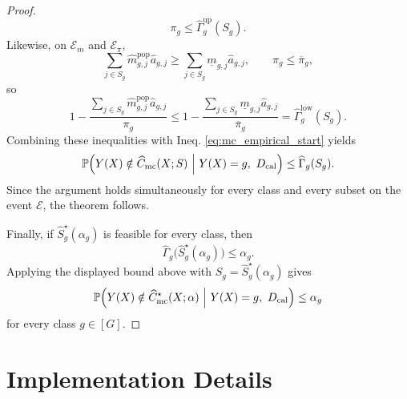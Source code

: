\documentclass[11pt]{article}
\theoremstyle{statplain}
\theoremstyle{statdefinition}
\newcommand{\mc}{\mathrm{mc}}
\newcommand{\PP}{\mathbb{P}}
\newcommand{\0}{\mathbf{0}}
\newcommand{\numClass}{G} %
\newcommand{\iteratorClass}{g}
\begin{document}
\begin{proof}
\[{}{
\pi_\iteratorClass
}
\le
\widehat\Gamma_{\iteratorClass}^{\mathrm{up}}(S_\iteratorClass).
\]
Likewise, on $\mathcal{E}_m$ and $\mathcal{E}_\pi$,
\[
\sum_{j\in S_\iteratorClass}
\widehat m_{\iteratorClass,j}^{\mathrm{pop}}
\widehat a_{\iteratorClass,j}
\ge
\sum_{j\in S_\iteratorClass}
\underline m_{\iteratorClass,j}
\widehat a_{\iteratorClass,j},
\qquad
\pi_\iteratorClass\le \overline\pi_\iteratorClass,
\]
so
\[
1-
\frac{
\sum_{j\in S_\iteratorClass}
\widehat m_{\iteratorClass,j}^{\mathrm{pop}}
\widehat a_{\iteratorClass,j}
}{
\pi_\iteratorClass
}
\le
1-
\frac{
\sum_{j\in S_\iteratorClass}
\underline m_{\iteratorClass,j}
\widehat a_{\iteratorClass,j}
}{
\overline\pi_\iteratorClass
}
=
\widehat\Gamma_{\iteratorClass}^{\mathrm{low}}(S_\iteratorClass).
\]
Combining these inequalities with Ineq. \eqref{eq:mc_empirical_start} yields
\[
\PP\Bigl(
Y(X)\notin \widehat C_{\mc}(X;S)
\ \Big|\
Y(X)=\iteratorClass,\ D_{\mathrm{cal}}
\Bigr)
\le
\widehat\Gamma_{\iteratorClass}(S_\iteratorClass).
\]
Since the argument holds simultaneously for every class and every subset on the event $\mathcal{E}$, the theorem follows.

Finally, if $\widehat S_\iteratorClass^\star(\alpha_\iteratorClass)$ is feasible for every class, then
\[
\widehat\Gamma_{\iteratorClass}\bigl(\widehat S_\iteratorClass^\star(\alpha_\iteratorClass)\bigr)
\le
\alpha_\iteratorClass.
\]
Applying the displayed bound above with $S_\iteratorClass=\widehat S_\iteratorClass^\star(\alpha_\iteratorClass)$ gives
\[
\PP\Bigl(
Y(X)\notin \widehat C_{\mc}^\star(X;\alpha)
\ \Big|\
Y(X)=\iteratorClass,\ D_{\mathrm{cal}}
\Bigr)
\le
\alpha_\iteratorClass
\]
for every class $\iteratorClass\in[\numClass]$.
\end{proof}
\clearpage
\section{Implementation Details}
\end{document}
